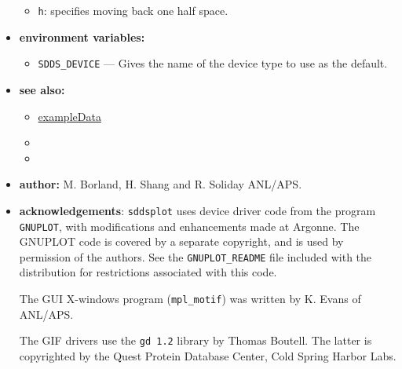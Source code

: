 \begin{itemize}
\begin{itemize}
\item {\tt h}: specifies moving back one half space.
\end{itemize}


\item {\bf environment variables:}
        \begin{itemize}
        \item {\tt SDDS\_DEVICE} --- Gives the name of the device type to use as the default.
        \end{itemize}
\item {\bf see also:}
    \begin{itemize}
    \item \hyperref{Data for Examples}{Data for Examples (see }{)}{exampleData}
    \item {}
    \item {}
    \end{itemize}
\item {\bf author:} M. Borland, H. Shang and R. Soliday ANL/APS.

\item {\bf acknowledgements}: {\tt sddsplot} uses device driver code from the program {\tt GNUPLOT}, 
with modifications and enhancements made at Argonne.  The GNUPLOT code is covered by a separate
copyright, and is used by permission of the authors.  See the {\tt GNUPLOT\_README} file included
with the distribution for restrictions associated with this code.

The GUI X-windows program ({\tt mpl\_motif}) was written by K. Evans of ANL/APS.

The GIF drivers use the {\tt gd 1.2} library by Thomas Boutell.  The latter is copyrighted by the
Quest Protein Database Center, Cold Spring Harbor Labs.

\end{itemize}


